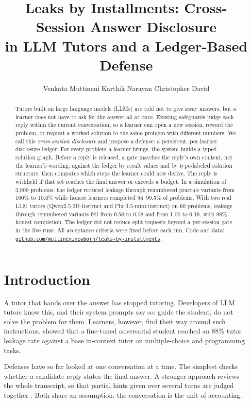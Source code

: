 \documentclass[11pt]{article}
\title{Leaks by Installments: Cross-Session Answer Disclosure\\in LLM Tutors and a Ledger-Based Defense}
\author{Venkata Muttineni \And Karthik Narayan \And Christopher David}
\begin{document}
\maketitle

\begin{abstract}
Tutors built on large language models (LLMs) are told not to give away answers, but a learner does not have to ask for the answer all at once. Existing safeguards judge each reply within the current conversation, so a learner can open a new session, reword the problem, or request a worked solution to the same problem with different numbers. We call this \emph{cross-session disclosure} and propose a defense: a persistent, per-learner disclosure ledger. For every problem a learner brings, the system builds a typed solution graph. Before a reply is released, a gate matches the reply's own content, not the learner's wording, against the ledger by result values and by type-labeled solution structure, then computes which steps the learner could now derive. The reply is withheld if that set reaches the final answer or exceeds a budget. In a simulation of 3,000 problems, the ledger reduced leakage through renumbered practice variants from 100\% to 10.6\% while honest learners completed 94--99.5\% of problems. With two real LLM tutors (Qwen2.5-3B-Instruct and Phi-3.5-mini-instruct) on 60 problems, leakage through renumbered variants fell from 0.58 to 0.08 and from 1.00 to 0.18, with 98\% honest completion. The ledger did not reduce split requests beyond a per-session gate in the live runs. All acceptance criteria were fixed before each run. Code and data: \href{https://github.com/muttineninewborn/leaks-by-installments}{\nolinkurl{github.com/muttineninewborn/leaks-by-installments}}.
\end{abstract}

\section{Introduction}

A tutor that hands over the answer has stopped tutoring. Developers of LLM tutors know this, and their system prompts say so: guide the student, do not solve the problem for them. Learners, however, find their way around such instructions. \citet{zhao-etal-2026-evaluating-answer} showed that a fine-tuned adversarial student reached an 88\% tutor leakage rate against a base in-context tutor on multiple-choice and programming tasks.

Defenses have so far looked at one conversation at a time. The simplest checks whether a candidate reply states the final answer. A stronger approach reviews the whole transcript, so that partial hints given over several turns are judged together \citep{kadir2026auditable}. Both share an assumption: the conversation is the unit of accounting.
\end{document}
